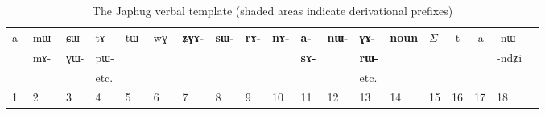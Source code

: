 \documentclass[oldfontcommands,oneside,a4paper,11pt]{article}
\newcommand{\ipab}[1]{{\scriptsize \phon#1}}
\newcommand{\grise}[1]{\cellcolor{lightgray}\textbf{#1}}
\begin{document}
   \begin{landscape}
\begin{table}[h]
\caption{The Japhug verbal template (shaded areas indicate derivational prefixes)}\label{tab:template:derivational}
\begin{tabular}{llllll|llllllll|lllll} \toprule
 
\ipab{a-}  &  	\ipab{mɯ- }   &  	\ipab{ɕɯ-}   &\ipab{tɤ-} &  	\ipab{tɯ-}  &  	\ipab{wɣ-}   &

  	 \grise{\ipab{ʑɣɤ-}}  &  	\grise{\ipab{sɯ-}}  & \grise{\ipab{rɤ-}}& \grise{\ipab{nɤ-}} &   	 \grise{\ipab{a-}}   &  	\grise{\ipab{nɯ-}}  &  	\grise{\ipab{ɣɤ-}}  &  	\grise{\ipab{noun}}    &  	 \begin{math}\Sigma\end{math}    &  	\ipab{-t}  &  	\ipab{-a}  &  	\ipab{-nɯ}   &  \\
   &  	\ipab{mɤ-}   &  	\ipab{ɣɯ-}   &\ipab{pɯ-}&  	  &  	 
    & \grise{ }	  &  	 \grise{ }	  &  	  \grise{ }	  &  	   \grise{ }	&  	\grise{\ipab{sɤ-}}&  \grise{ }	 &  	\grise{\ipab{rɯ-}}  &  	 \grise{ }	  &  	  &  	  &  	  &  	\ipab{-ndʑi} &  \\
  &  	   &     &  etc.	  & & 	  &  	  &  	 & &  	  &  	 & &  etc.	  &  	  &  	  &  	  &  	  &  	  &  \\
1  &  	2  &  	3  &  	4  &  	5  &  	6  &  	7  &  	8  &  	9  &  	10  &  	11  &  	12  &  	13  &  	14  &  	15  & 16 &17&18\\
\bottomrule
\end{tabular}
\end{table}
\begin{multicols}{2}
\begin{enumerate}



\end{enumerate}
\end{multicols}
\end{landscape}
\end{document}
